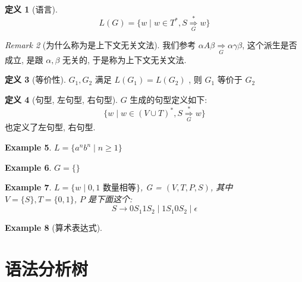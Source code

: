 \documentclass[12pt]{ctexart}
\theoremstyle{definition}
\theoremstyle{definition}
\newtheorem{definition}{定义}[section]
\theoremstyle{plain}
\newtheorem{exam}[definition]{Example}
\theoremstyle{remark}
\newtheorem{remark}[definition]{Remark}
\begin{document}
\begin{definition}[语言]
\begin{equation}
	L (G) =  \{ w \mid w \in T ^{*} , S \overset{*}{\underset{G}{\Rightarrow}} w \}
\end{equation}
\end{definition}

\begin{remark}[为什么称为是上下文无关文法]
	我们参考 \(\alpha A\beta \underset{G}{\Rightarrow}\alpha\gamma\beta\), 这个派生是否成立, 是跟 \(\alpha ,\beta\) 无关的, 于是称为上下文无关文法.
\end{remark}

\begin{definition}[等价性]
	\(G_{1} , G_{2}\) 满足 \(L (G _{1} )  =  L (G _{2} ) \) , 则 \(G_{1} \) 等价于 \(G_{2}\)
\end{definition}

\begin{definition}[句型, 左句型, 右句型]
	\(G\) 生成的句型定义如下: 
	\begin{equation}
		\{ w \mid w \in (V \cup T ) ^{*} , S \overset{*}{\underset{G}{\Rightarrow}} w \}
	\end{equation}
	也定义了左句型, 右句型.
\end{definition}


\begin{exam}
	\(L  = \{ a ^{n} b ^{n}\mid n \ge 1 \}\)
\end{exam}
\begin{exam}
	\(G = \{ \}\)
\end{exam}
\begin{exam}
	\(L = \{  w \mid 0,  1 \text{ 数量相等}\}\), G = \((V, T , P , S)\), 其中 \(V = \{ S \}, T = \{ 0 ,1 \}\), \(P \) 是下面这个:
	\[
	S \to 0S_{1} 1 S_{2} \mid 1 S_{1} 0 S_{2}  \mid \epsilon 
\]
\end{exam}

\begin{exam}[算术表达式]
\end{exam}


\section{语法分析树}\label{sec:tree}
\end{document}
